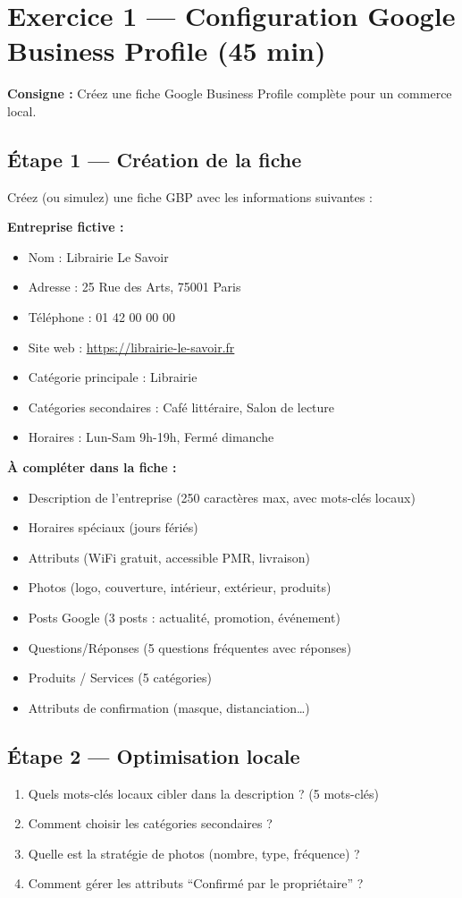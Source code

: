\documentclass[12pt,a4paper]{report}
\begin{document}
\section{Exercice 1 --- Configuration Google Business Profile (45 min)}

\textbf{Consigne :} Créez une fiche Google Business Profile complète pour un commerce local.

\subsection{Étape 1 --- Création de la fiche}
Créez (ou simulez) une fiche GBP avec les informations suivantes :

\textbf{Entreprise fictive :}
\begin{itemize}
\item Nom : Librairie Le Savoir
\item Adresse : 25 Rue des Arts, 75001 Paris
\item Téléphone : 01 42 00 00 00
\item Site web : \url{https://librairie-le-savoir.fr}
\item Catégorie principale : Librairie
\item Catégories secondaires : Café littéraire, Salon de lecture
\item Horaires : Lun-Sam 9h-19h, Fermé dimanche
\end{itemize}

\textbf{À compléter dans la fiche :}
\begin{itemize}
\item[$\square$] Description de l'entreprise (250 caractères max, avec mots-clés locaux)
\item[$\square$] Horaires spéciaux (jours fériés)
\item[$\square$] Attributs (WiFi gratuit, accessible PMR, livraison)
\item[$\square$] Photos (logo, couverture, intérieur, extérieur, produits)
\item[$\square$] Posts Google (3 posts : actualité, promotion, événement)
\item[$\square$] Questions/Réponses (5 questions fréquentes avec réponses)
\item[$\square$] Produits / Services (5 catégories)
\item[$\square$] Attributs de confirmation (masque, distanciation\ldots)
\end{itemize}

\subsection{Étape 2 --- Optimisation locale}
\begin{enumerate}
\item Quels mots-clés locaux cibler dans la description ? (5 mots-clés)
\item Comment choisir les catégories secondaires ?
\item Quelle est la stratégie de photos (nombre, type, fréquence) ?
\item Comment gérer les attributs ``Confirmé par le propriétaire'' ?
\end{enumerate}
\end{document}

